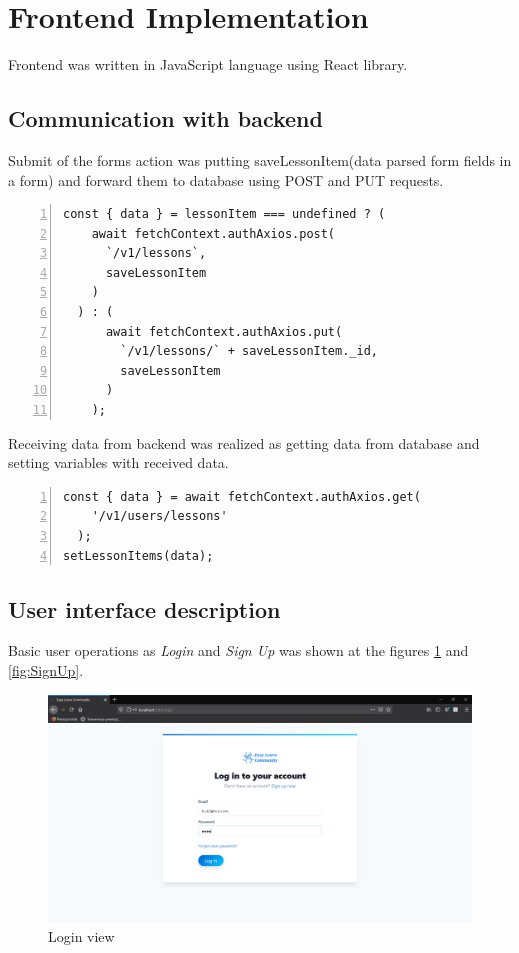 \section{Frontend Implementation}
Frontend was written in JavaScript language using React library.

\subsection{Communication with backend}
Submit of the forms action was putting saveLessonItem(data parsed form fields in a form) and forward them to database using POST and PUT requests.
\begin{lstlisting}[breaklines=true, numbers=left, stepnumber=1]
const { data } = lessonItem === undefined ? (
    await fetchContext.authAxios.post(
      `/v1/lessons`,
      saveLessonItem
    )
  ) : (
      await fetchContext.authAxios.put(
        `/v1/lessons/` + saveLessonItem._id,
        saveLessonItem
      )
    );
\end{lstlisting}

Receiving data from backend was realized as getting data from database and setting variables with received data.  
\begin{lstlisting}[breaklines=true, numbers=left, stepnumber=1]
const { data } = await fetchContext.authAxios.get(
    '/v1/users/lessons'
  );
setLessonItems(data);
\end{lstlisting}

\subsection{User interface description}
Basic user operations as \textit{Login} and \textit{Sign Up} was shown at the figures \ref{fig:Login} and \ref{fig:SignUp}.
\begin{figure}[H]
    \centering
    \includegraphics[width=\textwidth]{Include/Resources/Frontend/Login.png}
    \caption{Login view} 
    \label{fig:Login}
\end{figure}

